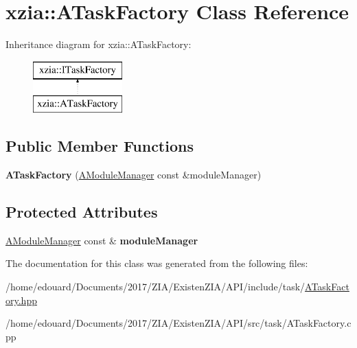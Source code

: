 \hypertarget{classxzia_1_1ATaskFactory}{}\section{xzia\+:\+:A\+Task\+Factory Class Reference}
\label{classxzia_1_1ATaskFactory}
Inheritance diagram for xzia\+:\+:A\+Task\+Factory\+:\begin{figure}[H]
\begin{center}
\leavevmode
\includegraphics[height=2.000000cm]{classxzia_1_1ATaskFactory}
\end{center}
\end{figure}
\subsection*{Public Member Functions}
\begin{DoxyCompactItemize}
\item 
\mbox{\label{classxzia_1_1ATaskFactory_a0bb8fd8cace10101adaff723dba56d01}} 
{\bfseries A\+Task\+Factory} (\mbox{\hyperlink{classxzia_1_1AModuleManager}{A\+Module\+Manager}} const \&module\+Manager)
\end{DoxyCompactItemize}
\subsection*{Protected Attributes}
\begin{DoxyCompactItemize}
\item 
\mbox{\label{classxzia_1_1ATaskFactory_a5746d8b145c2911231bc13c88b7484c4}} 
\mbox{\hyperlink{classxzia_1_1AModuleManager}{A\+Module\+Manager}} const  \& {\bfseries module\+Manager}
\end{DoxyCompactItemize}


The documentation for this class was generated from the following files\+:\begin{DoxyCompactItemize}
\item 
/home/edouard/\+Documents/2017/\+Z\+I\+A/\+Existen\+Z\+I\+A/\+A\+P\+I/include/task/\mbox{\hyperlink{ATaskFactory_8hpp}{A\+Task\+Factory.\+hpp}}\item 
/home/edouard/\+Documents/2017/\+Z\+I\+A/\+Existen\+Z\+I\+A/\+A\+P\+I/src/task/A\+Task\+Factory.\+cpp\end{DoxyCompactItemize}
